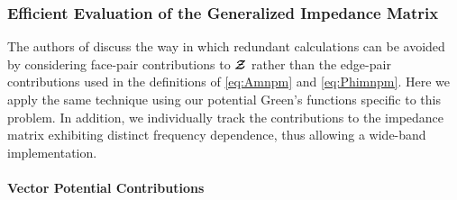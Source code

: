  \subsubsection{Efficient Evaluation of the Generalized Impedance Matrix}
 The authors of \cite{rawg:82} discuss the way in which redundant calculations can 
 be avoided by considering face-pair contributions to $\boldsymbol{\mathcal{Z}}$ rather than the 
 edge-pair contributions used in the definitions of \eqref{eq:Amnpm} and
 \eqref{eq:Phimnpm}.  Here we apply the same technique using our
 potential Green's functions specific to this problem.  In addition,
 we individually track the contributions to the impedance matrix 
 exhibiting distinct frequency dependence, thus allowing a
 wide-band implementation.

 \paragraph{Vector Potential Contributions}


